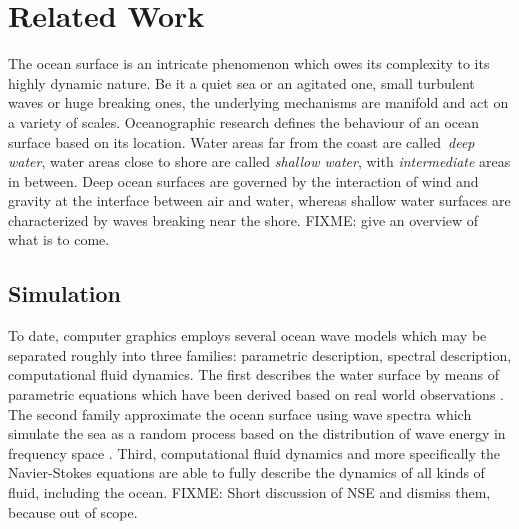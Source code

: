 \chapter{Related Work}
\label{ch:state_of_the_art}
%
The ocean surface is an intricate phenomenon which owes its complexity
to its highly dynamic nature. Be it a quiet sea or an agitated one, small
turbulent waves or huge breaking ones, the underlying mechanisms are manifold
and act on a variety of scales. Oceanographic research defines the behaviour of
an ocean surface based on its location. Water areas far from the coast are
called~\emph{deep water}, water areas close to shore are called
\emph{shallow water}, with \emph{intermediate} areas in between. Deep ocean
surfaces are governed by the interaction of wind and gravity at the interface
between air and water, whereas shallow water surfaces are characterized by waves
breaking near the shore. FIXME: give an overview of what is to come.
%
\section{Simulation}
%
To date, computer graphics employs several ocean wave models which may be
separated roughly into three families: parametric description, spectral
description, computational fluid dynamics. The first describes the water surface
by means of parametric equations which have been derived based on real world
observations \citep{Gerstner:1809,Rankine:1863,Biesel:1952}.
The second family approximate the ocean surface using wave spectra which
simulate the sea as a random process based on the distribution of wave energy
in frequency space \citep{book:kinsman2002wind,article:PiersonMoskowitz1964,
article:Hasselman1973,article:Donelan1985,article:Elfouhaily1997}.
Third, computational fluid dynamics and more specifically the Navier-Stokes
equations are able to fully describe the dynamics of all kinds of fluid,
including the ocean. FIXME: Short discussion of NSE and dismiss them, because
out of scope. \cite{Bridson:2015} \cite{egstar:2014}
%
